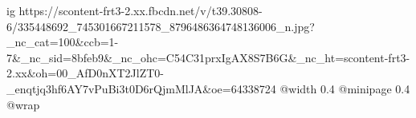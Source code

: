  
 
 
 
 

\ifcmt
  ig https://scontent-frt3-2.xx.fbcdn.net/v/t39.30808-6/335448692_745301667211578_8796486364748136006_n.jpg?_nc_cat=100&ccb=1-7&_nc_sid=8bfeb9&_nc_ohc=C54C31prxIgAX8S7B6G&_nc_ht=scontent-frt3-2.xx&oh=00_AfD0nXT2JlZT0-_enqtjq3hf6AY7vPuBi3t0D6rQjmMlJA&oe=64338724
  @width 0.4
  @minipage 0.4
  @wrap \parpic[r]
\fi
